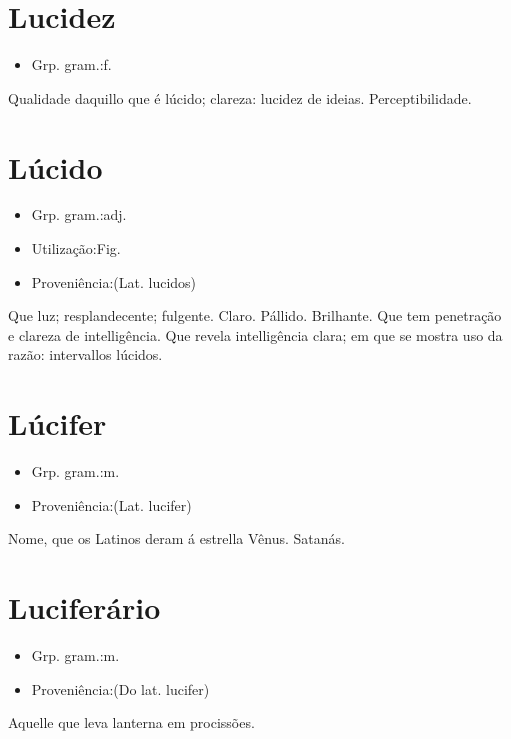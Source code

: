 \section{Lucidez}
\begin{itemize}
\item {Grp. gram.:f.}
\end{itemize}
Qualidade daquillo que é lúcido; clareza: \textunderscore lucidez de ideias\textunderscore .
Perceptibilidade.
\section{Lúcido}
\begin{itemize}
\item {Grp. gram.:adj.}
\end{itemize}
\begin{itemize}
\item {Utilização:Fig.}
\end{itemize}
\begin{itemize}
\item {Proveniência:(Lat. \textunderscore lucidos\textunderscore )}
\end{itemize}
Que luz; resplandecente; fulgente.
Claro.
Pállido.
Brilhante.
Que tem penetração e clareza de intelligência.
Que revela intelligência clara; em que se mostra uso da razão: \textunderscore intervallos lúcidos\textunderscore .
\section{Lúcifer}
\begin{itemize}
\item {Grp. gram.:m.}
\end{itemize}
\begin{itemize}
\item {Proveniência:(Lat. \textunderscore lucifer\textunderscore )}
\end{itemize}
Nome, que os Latinos deram á estrella Vênus.
Satanás.
\section{Luciferário}
\begin{itemize}
\item {Grp. gram.:m.}
\end{itemize}
\begin{itemize}
\item {Proveniência:(Do lat. \textunderscore lucifer\textunderscore )}
\end{itemize}
Aquelle que leva lanterna em procissões.
